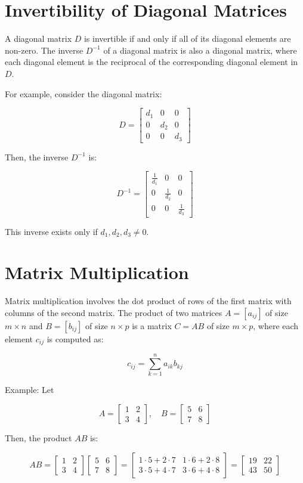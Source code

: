 \documentclass{article}
\begin{document}
\section{Invertibility of Diagonal Matrices}
A diagonal matrix \( D \) is invertible if and only if all of its diagonal elements are non-zero. The inverse \( D^{-1} \) of a diagonal matrix is also a diagonal matrix, where each diagonal element is the reciprocal of the corresponding diagonal element in \( D \).

For example, consider the diagonal matrix:

\[
D = \begin{bmatrix}
d_1 & 0 & 0 \\
0 & d_2 & 0 \\
0 & 0 & d_3
\end{bmatrix}
\]

Then, the inverse \( D^{-1} \) is:

\[
D^{-1} = \begin{bmatrix}
\frac{1}{d_1} & 0 & 0 \\
0 & \frac{1}{d_2} & 0 \\
0 & 0 & \frac{1}{d_3}
\end{bmatrix}
\]

This inverse exists only if \( d_1, d_2, d_3 \neq 0 \).

\section{Matrix Multiplication}
Matrix multiplication involves the dot product of rows of the first matrix with columns of the second matrix. The product of two matrices \( A = [a_{ij}] \) of size \( m \times n \) and \( B = [b_{ij}] \) of size \( n \times p \) is a matrix \( C = AB \) of size \( m \times p \), where each element \( c_{ij} \) is computed as:

\[
c_{ij} = \sum_{k=1}^{n} a_{ik} b_{kj}
\]

Example: Let 

\[
A = \begin{bmatrix} 1 & 2 \\ 3 & 4 \end{bmatrix}, \quad
B = \begin{bmatrix} 5 & 6 \\ 7 & 8 \end{bmatrix}
\]

Then, the product \( AB \) is:

\[
AB = \begin{bmatrix} 1 & 2 \\ 3 & 4 \end{bmatrix} 
\begin{bmatrix} 5 & 6 \\ 7 & 8 \end{bmatrix}
= \begin{bmatrix} 1 \cdot 5 + 2 \cdot 7 & 1 \cdot 6 + 2 \cdot 8 \\ 
3 \cdot 5 + 4 \cdot 7 & 3 \cdot 6 + 4 \cdot 8 \end{bmatrix}
= \begin{bmatrix} 19 & 22 \\ 43 & 50 \end{bmatrix}
\]
\end{document}
